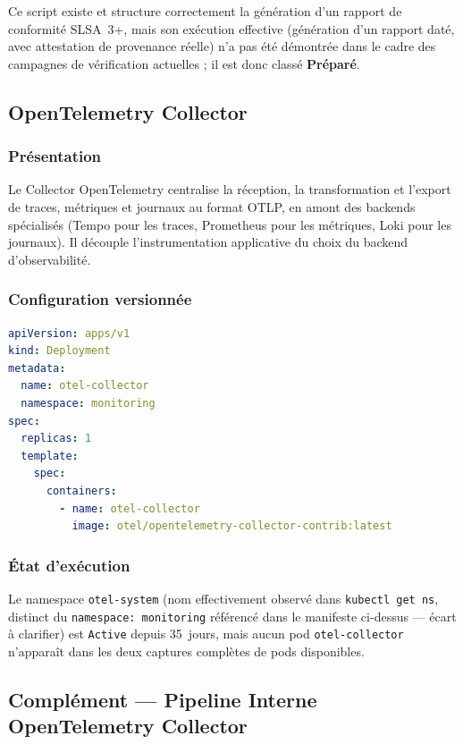 Ce script existe et structure correctement la génération d'un rapport de conformité SLSA~3+, mais son exécution effective (génération d'un rapport daté, avec attestation de provenance réelle) n'a pas été démontrée dans le cadre des campagnes de vérification actuelles ; il est donc classé \textbf{Préparé}.

\subsection{OpenTelemetry Collector}
\label{subsec:otel_v2}

\subsubsection{Présentation}
Le Collector OpenTelemetry centralise la réception, la transformation et l'export de traces, métriques et journaux au format OTLP, en amont des backends spécialisés (Tempo pour les traces, Prometheus pour les métriques, Loki pour les journaux). Il découple l'instrumentation applicative du choix du backend d'observabilité.

\subsubsection{Configuration versionnée}
\begin{lstlisting}[language=yaml, caption={Extrait réel du déploiement du Collector OpenTelemetry (\texttt{infra/k8s/otel/deployment.yaml})}, label={lst:otel_deployment_reel}]
apiVersion: apps/v1
kind: Deployment
metadata:
  name: otel-collector
  namespace: monitoring
spec:
  replicas: 1
  template:
    spec:
      containers:
        - name: otel-collector
          image: otel/opentelemetry-collector-contrib:latest
\end{lstlisting}

\subsubsection{État d'exécution}
Le namespace \texttt{otel-system} (nom effectivement observé dans \texttt{kubectl get ns}, distinct du \texttt{namespace: monitoring} référencé dans le manifeste ci-dessus — écart à clarifier) est \texttt{Active} depuis 35~jours, mais aucun pod \texttt{otel-collector} n'apparaît dans les deux captures complètes de pods disponibles.

\subsection*{Complément — Pipeline Interne OpenTelemetry Collector}

